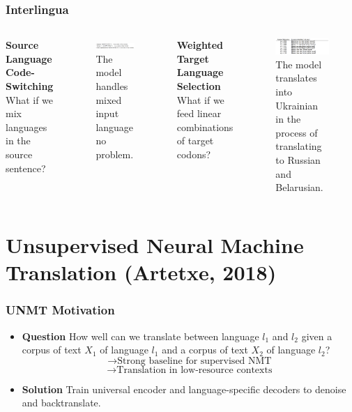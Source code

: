 \documentclass{beamer}
\begin{document}
\begin{frame}
\frametitle{Interlingua}
\begin{columns} %

\textbf{Source Language Code-Switching}
What if we mix languages in the source sentence?
 \begin{figure}
  \centering
  \includegraphics[width=\textwidth]{pres_imgs/srcswitch}
  \caption{\label{fig:srcswitch} The model handles mixed input language no problem.}
\end{figure}

\textbf{Weighted Target Language Selection}
What if we feed linear combinations of target codons?
 \begin{figure}
  \centering
  \includegraphics[width=\textwidth]{pres_imgs/trgswitch}
  \caption{\label{fig:trgswitch} The model translates into Ukrainian in the process of translating to Russian and Belarusian.}
\end{figure}
\end{columns}
\end{frame}

\section{Unsupervised Neural Machine Translation (Artetxe, 2018)}
\begin{frame}
\frametitle{UNMT Motivation}
\begin{itemize}
\item \textbf{Question} How well can we translate between language $l_1$ and $l_2$ given a corpus of text $X_1$ of language $l_1$ and a corpus of text $X_2$ of language $l_2$?\\
$$\rightarrow \text{Strong baseline for supervised NMT}$$
$$\rightarrow \text{Translation in low-resource contexts}$$
\pause
\item \textbf{Solution} Train universal encoder and language-specific decoders to denoise and backtranslate.
\end{itemize}
\end{frame}
\end{document}
